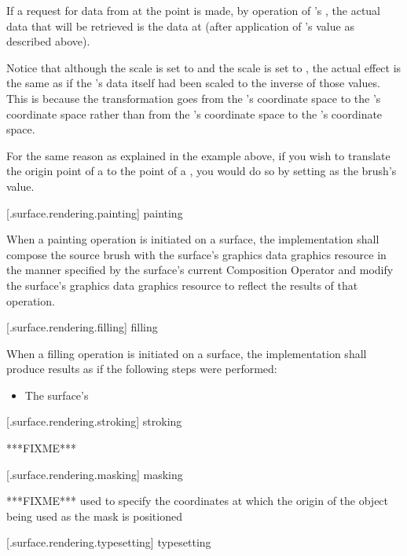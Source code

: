 \pnum
If a request for data from  at the point  is made, by operation of 's , the actual data that will be retrieved is the data at  (after application of 's  value as described above).

\pnum
Notice that although the \xaxis scale is set to  and the \yaxis scale is set to , the actual effect is the same as if the 's data itself had been scaled to the inverse of those values. This is because the transformation goes from the 's coordinate space to the 's coordinate space rather than from the 's coordinate space to the 's coordinate space.
\exitexample

\pnum
\enternote
For the same reason as explained in the example above, if you wish to translate the origin point of a  to the point  of a , you would do so by setting  as the brush's  value.
\exitnote

 [\iotwod.surface.rendering.painting] { painting}

\pnum
When a painting operation is initiated on a surface, the implementation shall compose the source brush with the surface's graphics data graphics resource in the manner specified by the surface's current Composition Operator and modify the surface's graphics data graphics resource to reflect the results of that operation.

 [\iotwod.surface.rendering.filling] { filling}

\pnum
When a filling operation is initiated on a surface, the implementation shall produce results as if the following steps were performed:
\begin{itemize}
	\item The surface's 
\end{itemize}

 [\iotwod.surface.rendering.stroking] { stroking}

\pnum
***FIXME***

 [\iotwod.surface.rendering.masking] { masking}

\pnum
***FIXME*** used to specify the coordinates at which the origin of the  object being used as the mask is positioned

 [\iotwod.surface.rendering.typesetting] { typesetting}

